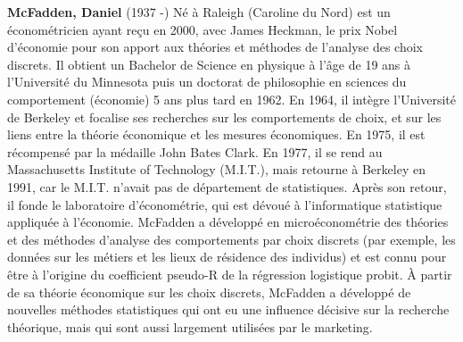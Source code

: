 \textbf{McFadden, Daniel} (1937 -) Né à Raleigh (Caroline du Nord) est un économétricien ayant reçu en 2000, avec James Heckman, le prix Nobel d'économie pour son apport aux théories et méthodes de l'analyse des choix discrets. Il obtient un Bachelor de Science en physique à l'âge de 19 ans à l'Université du Minnesota puis un doctorat de philosophie en sciences du comportement (économie) 5 ans plus tard en 1962. En 1964, il intègre l'Université de Berkeley et focalise ses recherches sur les comportements de choix, et sur les liens entre la théorie économique et les mesures économiques. En 1975, il est récompensé par la médaille John Bates Clark. En 1977, il se rend au Massachusetts Institute of Technology (M.I.T.), mais retourne à Berkeley en 1991, car le M.I.T. n'avait pas de département de statistiques. Après son retour, il fonde le laboratoire d'économétrie, qui est dévoué à l'informatique statistique appliquée à l'économie. McFadden a développé en microéconométrie des théories et des méthodes d'analyse des comportements par choix discrets (par exemple, les données sur les métiers et les lieux de résidence des individus) et est connu pour être à l'origine du coefficient pseudo-R de la régression logistique probit. À partir de sa théorie économique sur les choix discrets, McFadden a développé de nouvelles méthodes statistiques qui ont eu une influence décisive sur la recherche théorique, mais qui sont aussi largement utilisées par le marketing.

